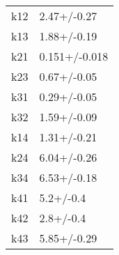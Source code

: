\begin{tabular}{ll}
\toprule
k12 &    2.47+/-0.27 \\
k13 &    1.88+/-0.19 \\
k21 &  0.151+/-0.018 \\
k23 &    0.67+/-0.05 \\
k31 &    0.29+/-0.05 \\
k32 &    1.59+/-0.09 \\
k14 &    1.31+/-0.21 \\
k24 &    6.04+/-0.26 \\
k34 &    6.53+/-0.18 \\
k41 &      5.2+/-0.4 \\
k42 &      2.8+/-0.4 \\
k43 &    5.85+/-0.29 \\
\bottomrule
\end{tabular}
